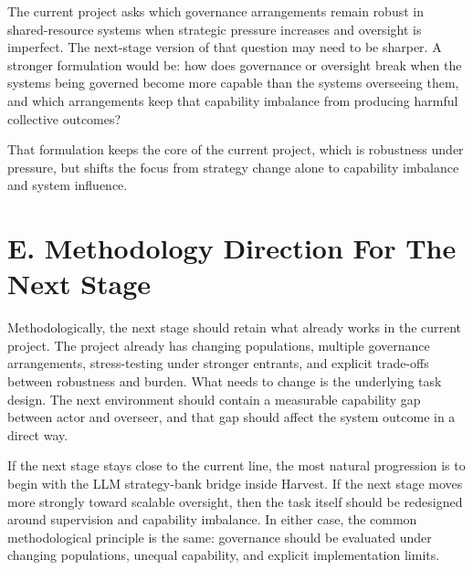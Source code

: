 \documentclass[11pt]{article}
\begin{document}
The current project asks which governance arrangements remain robust in shared-resource systems when strategic pressure increases and oversight is imperfect. The next-stage version of that question may need to be sharper. A stronger formulation would be: how does governance or oversight break when the systems being governed become more capable than the systems overseeing them, and which arrangements keep that capability imbalance from producing harmful collective outcomes?

That formulation keeps the core of the current project, which is robustness under pressure, but shifts the focus from strategy change alone to capability imbalance and system influence.

\section*{E. Methodology Direction For The Next Stage}

Methodologically, the next stage should retain what already works in the current project. The project already has changing populations, multiple governance arrangements, stress-testing under stronger entrants, and explicit trade-offs between robustness and burden. What needs to change is the underlying task design. The next environment should contain a measurable capability gap between actor and overseer, and that gap should affect the system outcome in a direct way.

If the next stage stays close to the current line, the most natural progression is to begin with the LLM strategy-bank bridge inside Harvest. If the next stage moves more strongly toward scalable oversight, then the task itself should be redesigned around supervision and capability imbalance. In either case, the common methodological principle is the same: governance should be evaluated under changing populations, unequal capability, and explicit implementation limits.
\end{document}
